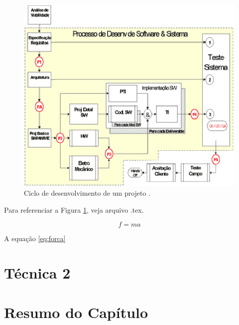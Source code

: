 \begin{figure}[htbp]
\centering
\includegraphics[scale=1.2]{Metodologia/ciclodesenvolvimento.eps}
\caption{Ciclo de desenvolvimento de um projeto \cite{and/74}.}
\label{CicloDesenvolvimento1}
\end{figure}

Para referenciar a Figura \ref{CicloDesenvolvimento1}, veja arquivo .tex.

\begin{equation}\label{eq:forca}
	f=ma
\end{equation}

A equação \ref{eq:forca}
\section{Técnica 2}
\label{metodo1a}

\section{Resumo do Capítulo}
\label{metodo1b}




\clearpage